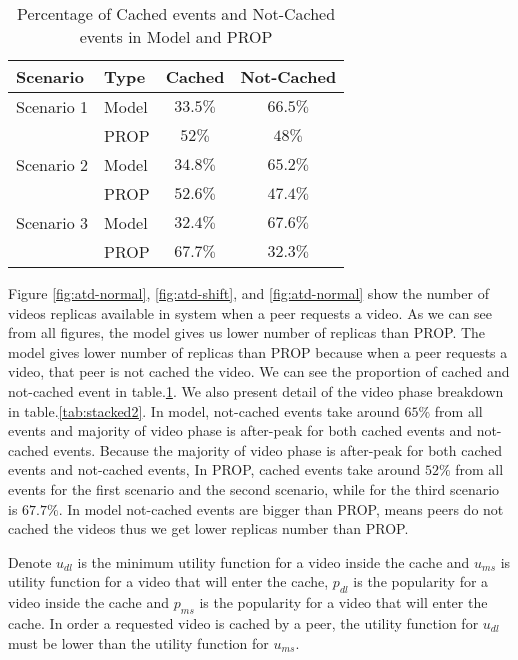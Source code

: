 \begin{table}[!t]
\caption{Percentage of Cached events and Not-Cached events in Model and PROP}
\label{tab:stacked1}
\centering
\begin{tabular}{|l|l|c|c|}
\hline
Scenario & Type & Cached & Not-Cached\\
\hline
Scenario 1 & Model & $33.5\%$ & $66.5\%$ \\
\hline
 & PROP & $52\%$ & $48\%$  \\
\hline

Scenario 2 & Model & $34.8\%$ & $65.2\%$ \\
\hline
 & PROP & $52.6\%$ & $47.4\%$  \\
\hline

Scenario 3 & Model & $32.4\%$ & $67.6\%$  \\
\hline
 & PROP & $67.7\%$ & $32.3\%$ \\
\hline
\end{tabular}
\end{table}

Figure \ref{fig:atd-normal}, \ref{fig:atd-shift}, and \ref{fig:atd-normal} show the number of  videos replicas available in system when a peer requests a video.
As we can see from all figures, the model gives us lower number of replicas than PROP.
The model gives lower number of replicas than PROP because when a peer requests a video, that peer is not cached the video.
We can see the proportion of cached and not-cached event in table.\ref{tab:stacked1}. 
We also present detail of the video phase breakdown in table.\ref{tab:stacked2}.
In model, not-cached events take around $65\%$ from all events and majority of video phase is  after-peak for both cached events and not-cached events. 
Because the majority of video phase is  after-peak for both cached events and not-cached events, 
In PROP, cached events take around $52\%$ from all events for the first scenario and the second scenario, while for the third scenario is $67.7\%$.
In model not-cached events are bigger than PROP, means peers do not cached the videos thus we get lower replicas number than PROP.


Denote $u_{dl}$ is the minimum utility function for a video inside the cache and $u_{ms}$ is utility function for a video that will enter the cache,  $p_{dl}$ is the popularity for a video inside the cache and $p_{ms}$ is the popularity for a video that will enter the cache.
In order a requested video is cached by a peer, the utility function for $u_{dl}$ must be lower than the utility function for $u_{ms}$.

